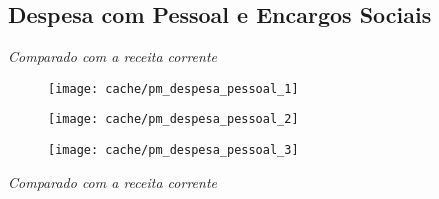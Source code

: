 
\subsection{Despesa com Pessoal e Encargos Sociais}






\textit{Comparado com a receita corrente}

\begin{figure}[H]
\center
\texttt{[image: cache/pm\_despesa\_pessoal\_1]}
\end{figure}

\begin{figure}[H]
\center
\texttt{[image: cache/pm\_despesa\_pessoal\_2]}
\end{figure}

\begin{figure}[H]
\center
\texttt{[image: cache/pm\_despesa\_pessoal\_3]}
\end{figure}

\textit{Comparado com a receita corrente}
